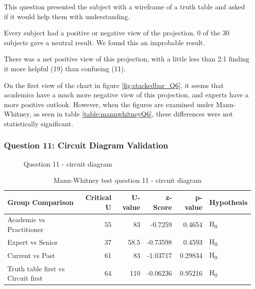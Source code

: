 This question presented the subject with a wireframe of a truth table and asked if it would help them with understanding.

Every subject had a positive or negative view of the projection.
0 of the 30 subjects gave a neutral result.
We found this an improbable result.

There was a net positive view of this projection, with a little less than 2:1 finding it more helpful (19) than confusing (11).

On the first view of the chart in figure \ref{fig:stackedbar_Q6}, it seems that academics have a much more negative view of this projection, and experts have a more positive outlook.
However, when the figures are examined under Mann-Whitney, as seen in table \ref{table:mannwhitneyQ6}, these differences were not statistically significant.

\subsubsection{Question 11: Circuit Diagram Validation}

\begin{figure}[H]
    \centering
    \caption{Question 11 - circuit diagram}
    \label{fig:stackedbar_Q7}
\end{figure}

\begin{table}[H]
    \begin{center}
        \begin{tabular}{ |l ||r |r |r | r|l | } 
            \hline
            Group Comparison                   & Critical U & U-value & z-Score  & p-value & Hypothesis         \\
            \hline
            \hline
            Academic vs Practitioner           & 55         & 83      & -0.7259  & 0.4654  & H\textsubscript{0} \\ 
            \hline
            Expert vs Senior                   & 37         & 58.5    & -0.73598 & 0.4593  & H\textsubscript{0} \\ 
            \hline
            Current vs Past                    & 61         & 83      & -1.03717 & 0.29834 & H\textsubscript{0} \\ 
            \hline
            Truth table first vs Circuit first & 64         & 110     & -0.06236 & 0.95216 & H\textsubscript{0} \\ 
            \hline
        \end{tabular}
    \end{center}
    \caption{Mann-Whitney test question 11 - circuit diagram}
    \label{table:mannwhitneyQ7}
\end{table}

